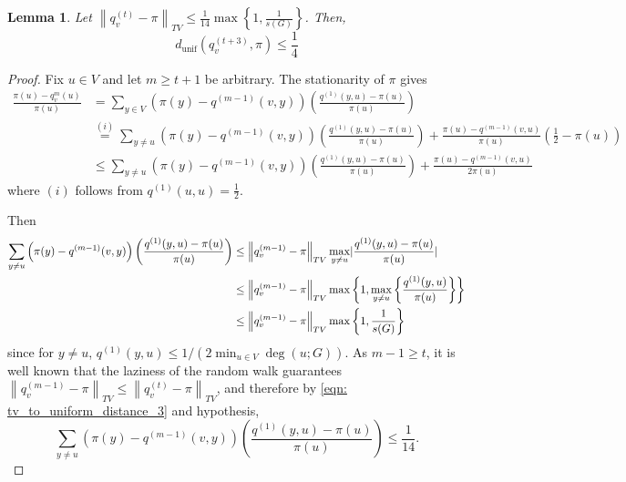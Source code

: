 \documentclass{article}
\DeclarePairedDelimiter\abs{\lvert}{\rvert}
\newcommand{\set}[1]{\left\{#1\right\}}
\newcommand{\norm}[1]{\left\lVert#1\right\rVert}
\newcommand{\1}{\mathbf{1}}
\theoremstyle{aldenthm}
\newtheorem{lemma}{Lemma}
\theoremstyle{aldenrmrk}
\begin{document}
\begin{lemma}
	\label{lem: tv_to_uniform_distance}
	Let $\norm{q_v^{(t)} - \pi}_{TV} \leq \frac{1}{14} \max \set{1, \frac{1}{s(G)}}$. Then,
	\begin{equation*}
	d_{\mathrm{unif}}(q_v^{(t + 3)},\pi) \leq \frac{1}{4}
	\end{equation*}
\end{lemma}
\begin{proof}
	Fix $u \in V$ and let $m \geq t + 1$ be arbitrary. The stationarity of $\pi$ gives
	\begin{align}
	\frac{\pi(u) - q_v^{m}(u)}{\pi(u)} & = \sum_{y \in V} \left(\pi(y) - q^{(m-1)}(v,y)\right) \left(\frac{q^{(1)}(y,u) - \pi(u)}{\pi(u)}\right) \nonumber \\
	& \overset{(i)}{=} \sum_{y \neq u} \left(\pi(y) - q^{(m-1)}(v,y)\right) \left(\frac{q^{(1)}(y,u) - \pi(u)}{\pi(u)}\right) + \frac{\pi(u) - q^{(m - 1)}(v,u)}{\pi(u)} \left(\frac{1}{2} - \pi(u)\right) \nonumber \\
	& \leq \sum_{y \neq u} \left(\pi(y) - q^{(m-1)}(v,y)\right) \left(\frac{q^{(1)}(y,u) - \pi(u)}{\pi(u)}\right) + \frac{\pi(u) - q^{(m - 1)}(v,u)}{2 \pi(u)} \label{eqn: tv_to_uniform_distance_1}
	\end{align}
	where $(i)$ follows from $q^{(1)}(u,u) = \frac{1}{2}$. 
	
	Then 
	\begin{align}
	\sum_{y \neq u} \left(\pi(y) - q^{(m-1)}(v,y)\right) \left(\frac{q^{(1)}(y,u) - \pi(u)}{\pi(u)}\right) & \leq \norm{q_v^{(m-1)} - \pi}_{TV} \max_{y \neq u} \abs{\frac{q^{(1)}(y,u) - \pi(u)}{\pi(u)}} \nonumber \\
	& \leq \norm{q_v^{(m-1)} - \pi}_{TV} \max \set{1, \max_{y \neq u}\set{\frac{q^{(1)}(y,u)}{\pi(u)}}} \nonumber \\
	& \leq \norm{q_v^{(m-1)} - \pi}_{TV} \max \set{1, \frac{1}{s(G)}} \label{eqn: tv_to_uniform_distance_3}
	\end{align}
	since for $y \neq u$, $q^{(1)}(y,u) \leq 1/\left(2 \min_{u \in V} \deg(u; G)\right)$. As $m - 1 \geq t$, it is well known \cite{lovasz1990} that the laziness of the random walk guarantees $\norm{q_v^{(m - 1)} - \pi}_{TV} \leq \norm{q_v^{(t)} - \pi}_{TV}$, and therefore by \eqref{eqn: tv_to_uniform_distance_3} and hypothesis,
	\begin{equation*}
	\sum_{y \neq u} \left(\pi(y) - q^{(m-1)}(v,y)\right) \left(\frac{q^{(1)}(y,u) - \pi(u)}{\pi(u)}\right) \leq \frac{1}{14}.
	\end{equation*}
	

\end{proof}
\end{document}
